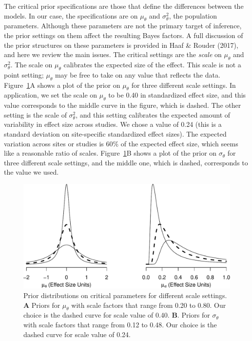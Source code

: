 \documentclass[english,man]{apa6}
\theoremstyle{definition}
\theoremstyle{definition}
\theoremstyle{remark}
\begin{document}
The critical prior specifications are those that define the differences
between the models. In our case, the specifications are on
\(\mu_\theta\) and \(\sigma^2_\theta\), the population parameters.
Although these parameters are not the primary target of inference, the
prior settings on them affect the resulting Bayes factors. A full
discussion of the prior structures on these parameters is provided in
Haaf \& Rouder (2017), and here we review the main issues. The critical
settings are the \emph{scale} on \(\mu_\theta\) and \(\sigma^2_\theta\).
The scale on \(\mu_\theta\) calibrates the expected size of the effect.
This scale is not a point setting; \(\mu_\theta\) may be free to take on
any value that reflects the data. Figure~\ref{fig:prior}A shows a plot
of the prior on \(\mu_\theta\) for three different scale settings. In
application, we set the scale on \(\mu_\theta\) to be 0.40 in
standardized effect size, and this value corresponds to the middle curve
in the figure, which is dashed. The other setting is the scale of
\(\sigma^2_\theta\), and this setting calibrates the expected amount of
variability in effect size across studies. We chose a value of 0.24
(this is a standard deviation on site-specific standardized effect
sizes). The expected variation across sites or studies is 60\% of the
expected effect size, which seems like a reasonable ratio of scales.
Figure~\ref{fig:prior}B shows a plot of the prior on \(\sigma_\theta\)
for three different scale settings, and the middle one, which is dashed,
corresponds to the value we used.








\begin{figure}[htbp]
\centering
\includegraphics{p_files/figure-latex/prior-1.pdf}
\caption{\label{fig:prior}Prior distributions on critical parameters for different scale
settings. \textbf{A} Priors for \(\mu_\theta\) with scale factors that
range from 0.20 to 0.80. Our choice is the dashed curve for scale value
of 0.40. \textbf{B}. Priors for \(\sigma_\theta\) with scale factors
that range from 0.12 to 0.48. Our choice is the dashed curve for scale
value of 0.24.}
\end{figure}
\end{document}
